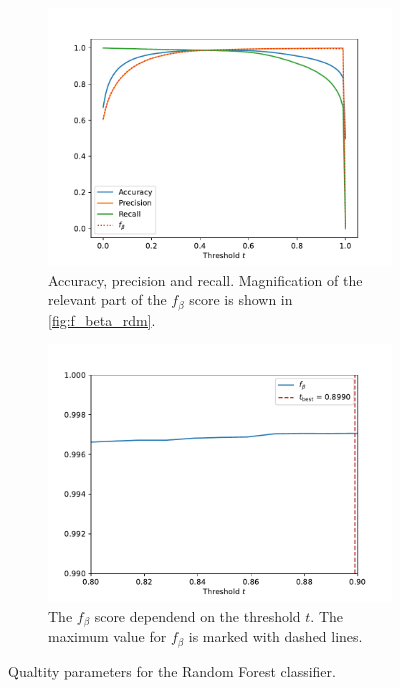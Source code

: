  \begin{figure}
     \centering
     \begin{subfigure}{0.49\textwidth}
        \centering
        \includegraphics[width=\textwidth]{content/plots/apr_rdm.pdf}
        \caption{Accuracy, precision and recall. Magnification of the relevant part of the $f_{\beta}$ score is shown in \autoref{fig:f_beta_rdm}.}
        \label{fig:apr_rdm}
     \end{subfigure}
        \hfill
     \begin{subfigure}{0.49\textwidth}
        \centering
        \includegraphics[width=\textwidth]{content/plots/f_beta_rdm.pdf}
        \caption{The $f_{\beta}$ score dependend on the threshold $t$. The maximum value for $f_{\beta}$ is marked with dashed lines.}
        \label{fig:f_beta_rdm}
     \end{subfigure}
     \caption{Qualtity parameters for the Random Forest classifier.}
     \label{fig:RDM}
   \end{figure}
